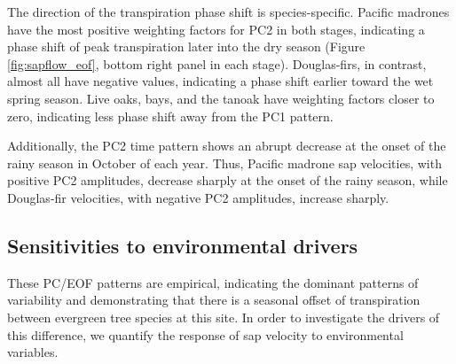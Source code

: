 The direction of the transpiration phase shift is species-specific.  Pacific madrones have the most positive weighting factors for PC2 in both stages, indicating a phase shift of peak transpiration later into the dry season (Figure \ref{fig:sapflow_eof}, bottom right panel in each stage).  Douglas-firs, in contrast, almost all have negative values, indicating a phase shift earlier toward the wet spring season.  Live oaks, bays, and the tanoak have weighting factors closer to zero, indicating less phase shift away from the PC1 pattern.

Additionally, the PC2 time pattern shows an abrupt decrease at the onset of the rainy season in October of each year.  Thus, Pacific madrone sap velocities, with positive PC2 amplitudes, decrease sharply at the onset of the rainy season, while Douglas-fir velocities, with negative PC2 amplitudes, increase sharply.

\subsection{Sensitivities to environmental drivers}
\label{sec:envresponse}

These PC/EOF patterns are empirical, indicating the dominant patterns of variability and demonstrating that there is a seasonal offset of transpiration between evergreen tree species at this site.  In order to investigate the drivers of this difference, we quantify the response of sap velocity to environmental variables.

